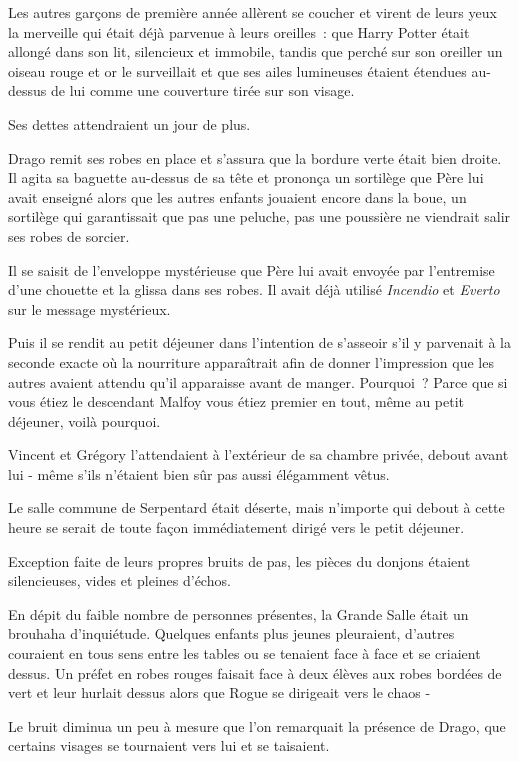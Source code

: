 Les autres garçons de première année allèrent se coucher et virent de leurs yeux la merveille qui était déjà parvenue à leurs oreilles~: que Harry Potter était allongé dans son lit, silencieux et immobile, tandis que perché sur son oreiller un oiseau rouge et or le surveillait et que ses ailes lumineuses étaient étendues au-dessus de lui comme une couverture tirée sur son visage.

Ses dettes attendraient un jour de plus.


Drago remit ses robes en place et s'assura que la bordure verte était bien droite. Il agita sa baguette au-dessus de sa tête et prononça un sortilège que Père lui avait enseigné alors que les autres enfants jouaient encore dans la boue, un sortilège qui garantissait que pas une peluche, pas une poussière ne viendrait salir ses robes de sorcier.

Il se saisit de l'enveloppe mystérieuse que Père lui avait envoyée par l'entremise d'une chouette et la glissa dans ses robes. Il avait déjà utilisé \emph{Incendio} et \emph{Everto} sur le message mystérieux.

Puis il se rendit au petit déjeuner dans l'intention de s'asseoir s'il y parvenait à la seconde exacte où la nourriture apparaîtrait afin de donner l'impression que les autres avaient attendu qu'il apparaisse avant de manger. Pourquoi~? Parce que si vous étiez le descendant Malfoy vous étiez premier en tout, même au petit déjeuner, voilà pourquoi.

Vincent et Grégory l'attendaient à l'extérieur de sa chambre privée, debout avant lui - même s'ils n'étaient bien sûr pas aussi élégamment vêtus.

Le salle commune de Serpentard était déserte, mais n'importe qui debout à cette heure se serait de toute façon immédiatement dirigé vers le petit déjeuner.

Exception faite de leurs propres bruits de pas, les pièces du donjons étaient silencieuses, vides et pleines d'échos.

En dépit du faible nombre de personnes présentes, la Grande Salle était un brouhaha d'inquiétude. Quelques enfants plus jeunes pleuraient, d'autres couraient en tous sens entre les tables ou se tenaient face à face et se criaient dessus. Un préfet en robes rouges faisait face à deux élèves aux robes bordées de vert et leur hurlait dessus alors que Rogue se dirigeait vers le chaos -

Le bruit diminua un peu à mesure que l'on remarquait la présence de Drago, que certains visages se tournaient vers lui et se taisaient.

